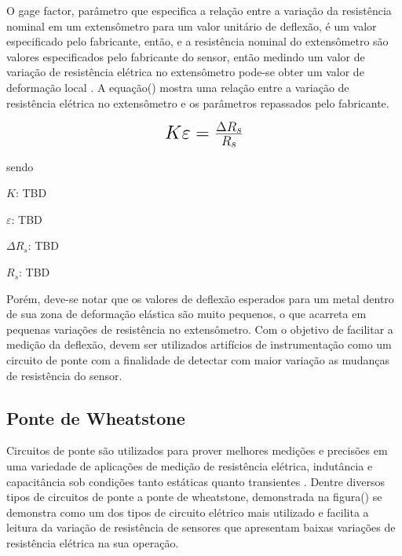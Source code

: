 O gage factor, parâmetro que especifica a relação entre a variação da resistência nominal em um extensômetro para um valor unitário de deflexão, é um valor especificado pelo fabricante, então, e a resistência nominal do extensômetro são valores especificados pelo fabricante do sensor, então medindo um valor de variação de resistência elétrica no extensômetro pode-se obter um valor de deformação local \autocite{Hollman2011}. A equação() mostra uma relação entre a variação de resistência elétrica no extensômetro e os parâmetros repassados pelo fabricante.

\begin{equation}\label{eq:Eq_210}%
\mbox{\fontsize{17.28}{21.6}\selectfont\( %
K \varepsilon = \frac{\Delta R_s }{R_s}
\)} %
\end{equation}

sendo

$K$: TBD

$\varepsilon$: TBD

$\Delta R_s$: TBD

$R_s$: TBD

\hfill

Porém, deve-se notar que os valores de deflexão esperados para um metal dentro de sua zona de deformação elástica são muito pequenos, o que acarreta em pequenas variações de resistência no extensômetro. Com o objetivo de facilitar a medição da deflexão, devem ser utilizados artifícios de instrumentação como um circuito de ponte com a finalidade de detectar com maior variação as mudanças de resistência do sensor.

\subsection{Ponte de Wheatstone}

Circuitos de ponte são utilizados para prover melhores medições e precisões em uma variedade de aplicações de medição de resistência elétrica, indutância e capacitância sob condições tanto estáticas quanto transientes \autocite{Hollman2011}. Dentre diversos tipos de circuitos de ponte a ponte de wheatstone, demonstrada na figura() se demonstra como um dos tipos de circuito elétrico mais utilizado e facilita a leitura da variação de resistência de sensores que apresentam baixas variações de resistência elétrica na sua operação.

